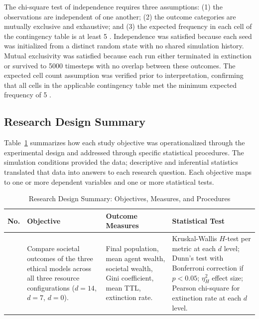 \documentclass{icsthesis}
\begin{document}
\begin{mainmatter}
			The chi-square test of independence requires three assumptions: (1) the observations are independent of one another; (2) the outcome categories are mutually exclusive and exhaustive; and (3) the expected frequency in each cell of the contingency table is at least 5 \citep{Cochran1954}. Independence was satisfied because each seed was initialized from a distinct random state with no shared simulation history. Mutual exclusivity was satisfied because each run either terminated in extinction or survived to 5000 timesteps with no overlap between these outcomes. The expected cell count assumption was verified prior to interpretation, confirming that all cells in the applicable contingency table met the minimum expected frequency of 5 \citep{Cochran1954}.
		
		\subsection{Research Design Summary}
			Table~\ref{table:research-design} summarizes how each study objective was operationalized through the experimental design and addressed through specific statistical procedures. The simulation conditions provided the data; descriptive and inferential statistics translated that data into answers to each research question. Each objective maps to one or more dependent variables and one or more statistical tests.

			\begin{table}[H]
			\vspace{2ex}
			\centering
			\caption{Research Design Summary: Objectives, Measures, and Procedures}
			\label{table:research-design}
			\footnotesize
			\renewcommand{\arraystretch}{1.5}
			\begin{tabular}{
				>{\raggedright\arraybackslash}p{0.4cm}
				>{\raggedright\arraybackslash}p{3.2cm}
				>{\raggedright\arraybackslash}p{3.2cm}
				>{\raggedright\arraybackslash}p{6.2cm}
			}
			\hline\hline
			\textbf{No.} & \textbf{Objective} & \textbf{Outcome Measures} & \textbf{Statistical Test} \\
			\hline
			1 &
				Compare societal outcomes of the three ethical models across all three resource configurations ($d = 14$, $d = 7$, $d = 0$). &
				Final population, mean agent wealth, societal wealth, Gini coefficient, mean TTL, extinction rate. &
				Kruskal-Wallis $H$-test per metric at each $d$ level; Dunn's test with Bonferroni correction if $p < 0.05$; $\eta^2_H$ effect size; Pearson chi-square for extinction rate at each $d$ level. \\


\end{tabular}
\end{table}
\end{mainmatter}
\end{document}
